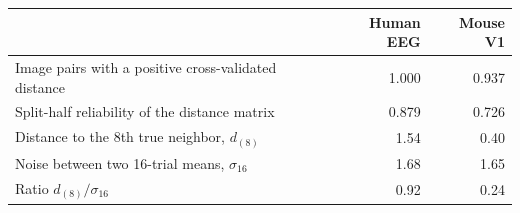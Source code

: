 \begin{tabular}{lrr}
\toprule
 & Human EEG & Mouse V1 \\
\midrule
Image pairs with a positive cross-validated distance & 1.000 & 0.937 \\
Split-half reliability of the distance matrix & 0.879 & 0.726 \\
Distance to the 8th true neighbor, $d_{(8)}$ & 1.54 & 0.40 \\
Noise between two 16-trial means, $\sigma_{16}$ & 1.68 & 1.65 \\
Ratio $d_{(8)}/\sigma_{16}$ & 0.92 & 0.24 \\
\bottomrule
\end{tabular}
